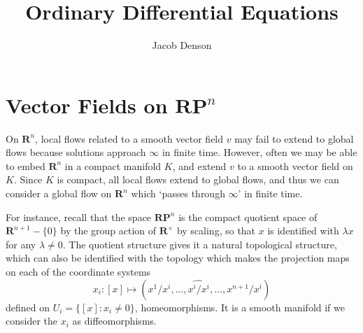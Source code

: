 

\title{Ordinary Differential Equations}
\author{Jacob Denson}




\maketitle

\tableofcontents


\chapter{Vector Fields on $\mathbf{RP}^n$}

On $\mathbf{R}^n$, local flows related to a smooth vector field $v$ may fail to extend to global flows because solutions approach $\infty$ in finite time. However, often we may be able to embed $\mathbf{R}^n$ in a compact manifold $K$, and extend $v$ to a smooth vector field on $K$. Since $K$ is compact, all local flows extend to global flows, and thus we can consider a global flow on $\mathbf{R}^n$ which `passes through $\infty$' in finite time.

For instance, recall that the space $\mathbf{RP}^n$ is the compact quotient space of $\mathbf{R}^{n+1} - \{ 0 \}$ by the group action of $\mathbf{R}^\times$ by scaling, so that $x$ is identified with $\lambda x$ for any $\lambda \neq 0$. The quotient structure gives it a natural topological structure, which can also be identified with the topology which makes the projection maps on each of the coordinate systems
%
\[ x_i: [x] \mapsto (x^1/x^i, \dots, \widehat{x^i/x^i}, \dots, x^{n+1}/x^i) \]
%
defined on $U_i = \{ [x] : x_i \neq 0 \}$, homeomorphisms. It is a smooth manifold if we consider the $x_i$ as diffeomorphisms.


